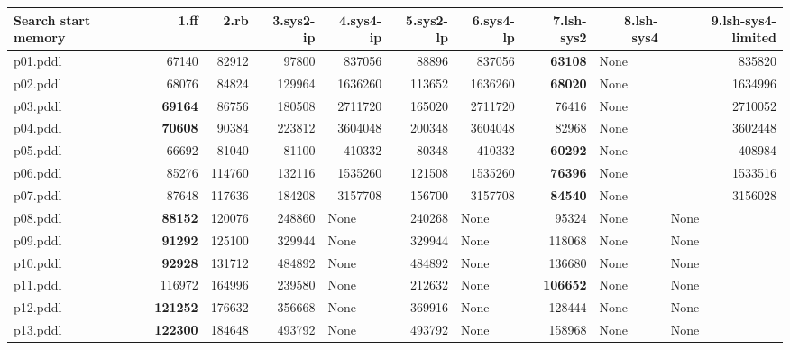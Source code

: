 \documentclass{article}
\begin{document}
\begin{tabular}{@{}lrrrrrrrrr@{}}
Search start memory & 1.ff & 2.rb & 3.sys2-ip & 4.sys4-ip & 5.sys2-lp & 6.sys4-lp & 7.lsh-sys2 & 8.lsh-sys4 & 9.lsh-sys4-limited \\
\midrule
p01.pddl & 67140 & 82912 & 97800 & 837056 & 88896 & 837056 & \textbf{63108} & \multicolumn{1}{|l|}{None} & 835820 \\
p02.pddl & 68076 & 84824 & 129964 & 1636260 & 113652 & 1636260 & \textbf{68020} & \multicolumn{1}{|l|}{None} & 1634996 \\
p03.pddl & \textbf{69164} & 86756 & 180508 & 2711720 & 165020 & 2711720 & 76416 & \multicolumn{1}{|l|}{None} & 2710052 \\
p04.pddl & \textbf{70608} & 90384 & 223812 & 3604048 & 200348 & 3604048 & 82968 & \multicolumn{1}{|l|}{None} & 3602448 \\
p05.pddl & 66692 & 81040 & 81100 & 410332 & 80348 & 410332 & \textbf{60292} & \multicolumn{1}{|l|}{None} & 408984 \\
p06.pddl & 85276 & 114760 & 132116 & 1535260 & 121508 & 1535260 & \textbf{76396} & \multicolumn{1}{|l|}{None} & 1533516 \\
p07.pddl & 87648 & 117636 & 184208 & 3157708 & 156700 & 3157708 & \textbf{84540} & \multicolumn{1}{|l|}{None} & 3156028 \\
p08.pddl & \textbf{88152} & 120076 & 248860 & \multicolumn{1}{|l|}{None} & 240268 & \multicolumn{1}{|l|}{None} & 95324 & \multicolumn{1}{|l|}{None} & \multicolumn{1}{|l|}{None} \\
p09.pddl & \textbf{91292} & 125100 & 329944 & \multicolumn{1}{|l|}{None} & 329944 & \multicolumn{1}{|l|}{None} & 118068 & \multicolumn{1}{|l|}{None} & \multicolumn{1}{|l|}{None} \\
p10.pddl & \textbf{92928} & 131712 & 484892 & \multicolumn{1}{|l|}{None} & 484892 & \multicolumn{1}{|l|}{None} & 136680 & \multicolumn{1}{|l|}{None} & \multicolumn{1}{|l|}{None} \\
p11.pddl & 116972 & 164996 & 239580 & \multicolumn{1}{|l|}{None} & 212632 & \multicolumn{1}{|l|}{None} & \textbf{106652} & \multicolumn{1}{|l|}{None} & \multicolumn{1}{|l|}{None} \\
p12.pddl & \textbf{121252} & 176632 & 356668 & \multicolumn{1}{|l|}{None} & 369916 & \multicolumn{1}{|l|}{None} & 128444 & \multicolumn{1}{|l|}{None} & \multicolumn{1}{|l|}{None} \\
p13.pddl & \textbf{122300} & 184648 & 493792 & \multicolumn{1}{|l|}{None} & 493792 & \multicolumn{1}{|l|}{None} & 158968 & \multicolumn{1}{|l|}{None} & \multicolumn{1}{|l|}{None} \\

\end{tabular}
\end{document}
